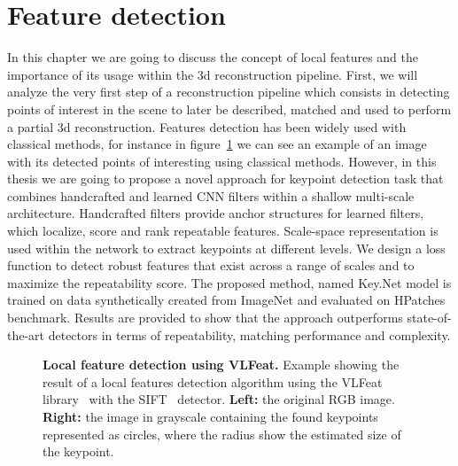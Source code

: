 
\section{Feature detection}

In this chapter we are going to discuss the concept of local features and the importance of its usage within the 3d reconstruction pipeline. First, we will analyze the very first step of a reconstruction pipeline which consists in detecting points of interest in the scene to later be described, matched and used to perform a partial 3d reconstruction. Features detection has been widely used with classical methods, for instance in figure~\ref{keynet_fig:feature_detection_example} we can see an example of an image with its detected points of interesting using classical methods. However, in this thesis we are going to propose a novel approach for keypoint detection task that combines handcrafted and learned CNN filters within a shallow multi-scale architecture. Handcrafted filters provide anchor structures for learned filters, which localize, score and rank repeatable features. Scale-space representation is used within the network to extract keypoints at different levels. We design a loss function to detect robust features that exist across a range of scales and to maximize the repeatability score. The proposed method, named Key.Net model is trained on data synthetically created from ImageNet and evaluated on HPatches benchmark. Results are provided to show that the approach outperforms state-of-the-art detectors in terms of repeatability, matching performance and complexity.

\begin{figure}
    \centering
    \qquad
    \caption[Local feature detection using VLFeat]{\textbf{Local feature detection using VLFeat.} Example showing the result of a local features detection algorithm using the VLFeat library~\cite{vedaldi08vlfeat} with the SIFT~\cite{SIFT} detector. \textbf{Left:} the original RGB image. \textbf{Right:} the image in grayscale containing the found keypoints represented as circles, where the radius show the estimated size of the keypoint.}
    \label{keynet_fig:feature_detection_example}
\end{figure}

